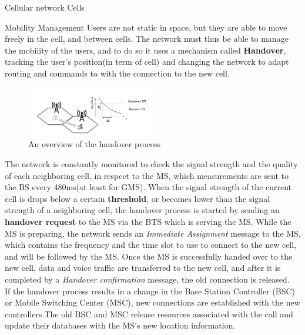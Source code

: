 \begin{section}{Cellular network Cells}
  \begin{subsection}{Mobility Management}
    Users are not static in space, but they are able to move freely in the cell, and between cells.
    The network must thus be able to manage the mobility of the users, and to do so it uses a
    mechanism called \textbf{Handover}, tracking the user's position(in term of cell) and changing
    the network to adapt routing and commands to with the connection to the new cell.\\
    \begin{figure}[h]
      \centering
      \includegraphics[width=0.5\textwidth]{img/wireless/mobile handover.png}
      \caption{An overview of the handover process}
      \label{fig:handover}
    \end{figure}
    The network is constantly monitored to check the signal strength and the quality of each
    neighboring cell, in respect to the MS, which measurements are sent to the BS every 480ms(at
    least for GMS). When the signal strength of the current cell is drops below a certain
    \textbf{threshold}, or becomes lower than the signal strength of a neighboring cell, the
    handover process is started by sending an \textbf{handover request} to the MS via the BTS which
    is serving the MS. While the MS is preparing, the network sends an \textit{Immediate Assignment}
    message to the MS, which contains the frequency and the time slot to use to connect to the new
    cell, and will be followed by the MS. Once the MS is successfully handed over to the new cell,
    data and voice traffic are transferred to the new cell, and after it is completed by a
    \textit{Handover confirmation} message, the old connection is released.\\
    If the handover process results in a change in the Base Station Controller (BSC) or Mobile
    Switching Center (MSC), new connections are established with the new controllers.The old BSC and
    MSC release resources associated with the call and update their databases with the MS’s new
    location information.
  \end{subsection}


\end{section}
